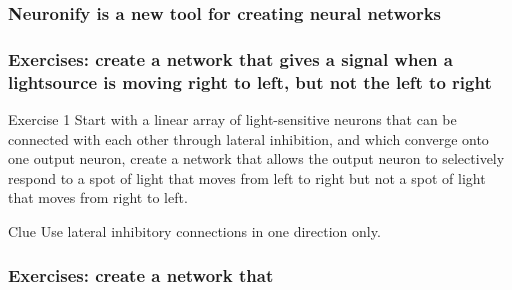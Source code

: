 \documentclass{beamer}
\begin{document}
\begin{frame}
\frametitle{Neuronify is a new tool for creating neural networks}
\end{frame}

\begin{frame}
\frametitle{Exercises: create a network that gives a signal when a lightsource is moving right to left, but not the left to right}

\begin{block}{Exercise 1}
Start with a linear array of light-sensitive neurons that can be connected with each other through lateral inhibition, and which converge onto one output neuron, create a network that allows the output neuron to selectively respond to a spot of light that moves from left to right but not a spot of light that moves from right to left. 
\end{block}

 {\begin{block}{Clue} Use lateral inhibitory connections in one direction only.\end{block}}
\end{frame}

\begin{frame}
\frametitle{Exercises: create a network that }

\end{frame}
\end{document}
